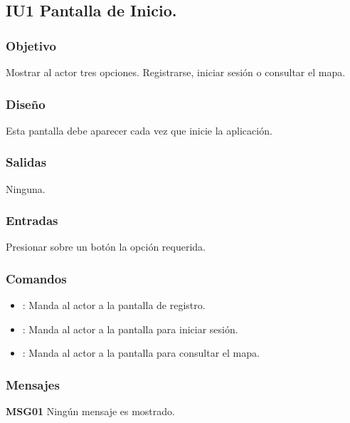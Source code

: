 
\subsection{IU1 Pantalla de Inicio.}

\subsubsection{Objetivo}
	Mostrar al actor tres opciones. Registrarse, iniciar sesión o consultar el mapa.

\subsubsection{Diseño}
	Esta pantalla debe aparecer cada vez que inicie la aplicación.


\subsubsection{Salidas}

	Ninguna.

\subsubsection{Entradas}
Presionar sobre un botón la opción requerida.

\subsubsection{Comandos}
\begin{itemize}
	\item {}: Manda al actor a la pantalla de registro.
	\item {}: Manda al actor a la pantalla para iniciar sesión.
	\item {}: Manda al actor a la pantalla para consultar el mapa.
\end{itemize}

\subsubsection{Mensajes}
\begin{Citemize}
	\item {\bf MSG01} Ningún mensaje es mostrado.
\end{Citemize}

